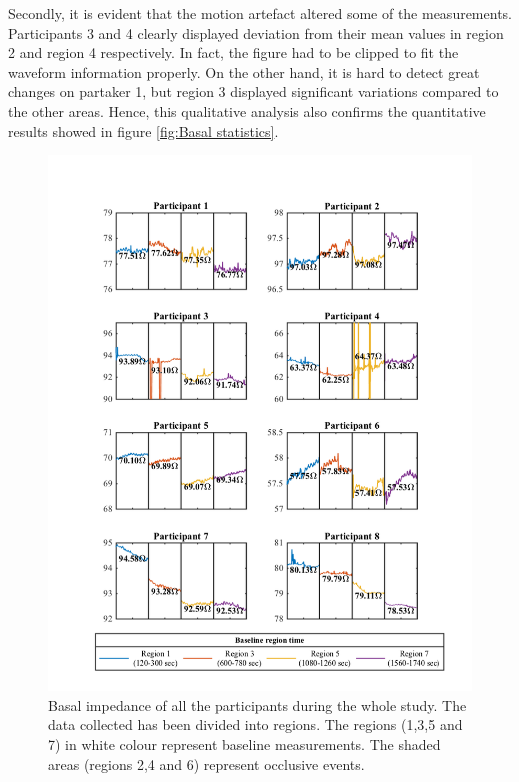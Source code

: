 Secondly, it is evident that the motion artefact altered some of the measurements. Participants 3 and 4 clearly displayed deviation from their mean values in region 2 and region 4 respectively. In fact, the figure had to be clipped to fit the waveform information properly. On the other hand, it is hard to detect great changes on partaker 1, but region 3 displayed significant variations compared to the other areas. Hence, this qualitative analysis also confirms the quantitative results showed in figure \ref{fig:Basal statistics}.  

\begin{figure}[!htbp]  %
	\includegraphics[width=\textwidth,keepaspectratio]{figure_b_3}    
	\caption[Measurements of the basal impedance during the whole study]{Basal impedance of all the participants during the whole study. The data collected has been divided into regions. The regions (1,3,5 and 7) in white colour represent baseline measurements. The shaded areas (regions 2,4 and 6) represent occlusive events.  }
	\label{fig:Basal Regions} 
\end{figure}

